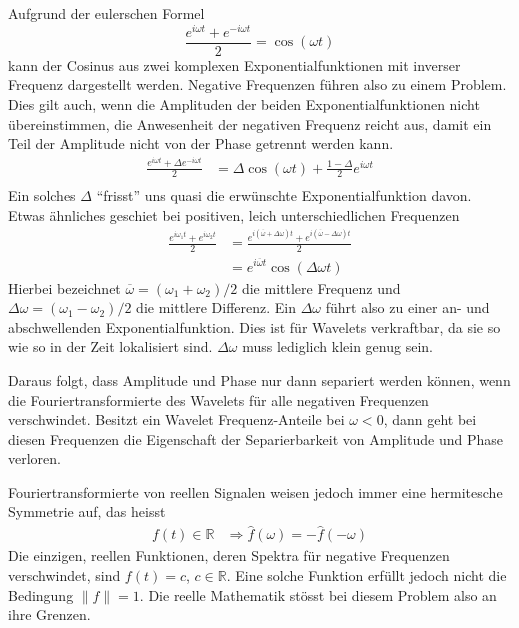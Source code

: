 Aufgrund der eulerschen Formel
\begin{equation}
	\frac{e^{i\omega t} + e^{-i\omega t}}{2} = \cos(\omega t)\label{complex:euler}
\end{equation}
kann der Cosinus aus zwei komplexen Exponentialfunktionen mit inverser Frequenz dargestellt werden.
Negative Frequenzen führen also zu einem Problem.
Dies gilt auch, wenn die Amplituden der beiden Exponentialfunktionen nicht übereinstimmen, die Anwesenheit der negativen Frequenz reicht aus, damit ein Teil der Amplitude nicht von der Phase getrennt werden kann.
\begin{align*}
	\frac{e^{i\omega t} + \Delta e^{-i\omega t}}{2} &=
	\Delta\cos(\omega t) + \frac{1-\Delta}{2} e^{i\omega t}\\
\end{align*}
Ein solches $\Delta$ ``frisst'' uns quasi die erwünschte Exponentialfunktion davon.
Etwas ähnliches geschiet bei positiven, leich unterschiedlichen Frequenzen
\begin{align*}
	\frac{e^{i\omega_1 t} + e^{i\omega_2 t}}{2} &=
	\frac{e^{i(\overline\omega + \Delta \omega) t} + e^{i(\overline\omega-\Delta\omega) t}}{2} \\
	&= e^{i\overline\omega t}\cos(\Delta\omega t)
\end{align*}
Hierbei bezeichnet $\overline\omega=(\omega_1+\omega_2)/2$ die mittlere Frequenz und $\Delta\omega=(\omega_1-\omega_2)/2$ die mittlere Differenz.
Ein $\Delta\omega$ führt also zu einer an- und abschwellenden Exponentialfunktion.
Dies ist für Wavelets verkraftbar, da sie so wie so in der Zeit lokalisiert sind.
$\Delta\omega$ muss lediglich klein genug sein.

Daraus folgt, dass Amplitude und Phase nur dann separiert werden können, wenn die Fouriertransformierte des Wavelets für alle negativen Frequenzen verschwindet.
Besitzt ein Wavelet Frequenz-Anteile bei $\omega < 0$, dann geht bei diesen Frequenzen die Eigenschaft der Separierbarkeit von Amplitude und Phase verloren.

Fouriertransformierte von reellen Signalen weisen jedoch immer eine hermitesche Symmetrie auf, das heisst
\begin{align*}
	f(t)\in\mathbb R &\Rightarrow \hat f(\omega) = -\hat f(-\omega)
\end{align*}
Die einzigen, reellen Funktionen, deren Spektra für negative Frequenzen verschwindet, sind $f(t) = c$, $c\in\mathbb R$.
Eine solche Funktion erfüllt jedoch nicht die Bedingung $\|f\| = 1$.
Die reelle Mathematik stösst bei diesem Problem also an ihre Grenzen.

